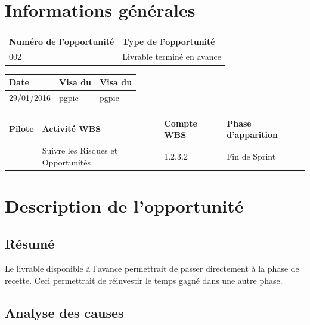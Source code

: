 
\section*{Informations générales}
 
\begin{table}[H]
\centering
	\begin{tabularx}{16.8cm}{|X|X|}
	\hline
	\rowcolor{gray!40} Numéro de l'opportunité & Type de l'opportunité \\
	\hline
	 002 & Livrable terminé en avance  \\
	\hline
	\end{tabularx}
\end{table}

\begin{table}[H]
\centering
	\begin{tabularx}{16.8cm}{|X|X|X|}
	\hline
	\rowcolor{gray!40} Date & Visa du \RQ & Visa du \CP \\
	\hline
	 29/01/2016 & pgpic & pgpic \\
	\hline
	\end{tabularx}
\end{table}

\begin{table}[H]
\centering
	\begin{tabularx}{16.8cm}{|X|X|X|X|}
	\hline
	\rowcolor{gray!40} Pilote & Activité WBS & Compte WBS & Phase d'apparition \\
	\hline
	 \Kafui & Suivre les Risques et Opportunités & 1.2.3.2 & Fin de Sprint \\
	\hline
	\end{tabularx}
\end{table}

\section*{Description de l'opportunité}

\subsection*{Résumé}
	Le livrable disponible à l'avance permettrait de passer directement à la phase de recette. Ceci permettrait de réinvestir le temps gagné dans une autre phase.
	
\subsection*{Analyse des causes}
	
